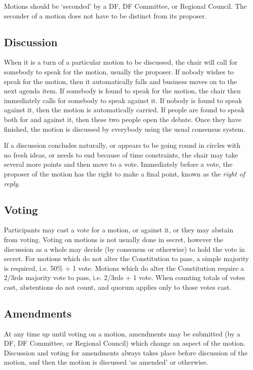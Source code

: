 \documentclass[a4paper, 11pt]{article} %
\begin{document}
Motions should be `seconded' by a DF, DF Committee, or Regional Council.  The seconder of a motion does not have to be distinct from its proposer.

\subsection{Discussion}
When it is a turn of a particular motion to be discussed, the chair will call for somebody to speak for the motion, usually the proposer.  If nobody wishes to speak for the motion, then it automatically falls and business moves on to the next agenda item.  If somebody is found to speak for the motion, the chair then immediately calls for somebody to speak against it.  If nobody is found to speak against it, then the motion is automatically carried.  If people are found to speak both for and against it, then these two people open the debate.  Once they have finished, the motion is discussed by everybody using the usual consensus system.

If a discussion concludes naturally, or appears to be going round in circles with no fresh ideas, or needs to end because of time constraints, the chair may take several more points and then move to a vote.  Immediately before a vote, the proposer of the motion has the right to make a final point, known as the \emph{right of reply}.

\subsection{Voting}
\label{sec:motionvoting}
Participants may cast a vote for a motion, or against it, or they may abstain from voting.  Voting on motions is not usually done in secret, however the discussion as a whole may decide (by consensus or otherwise) to hold the vote in secret.  For motions which do not alter the Constitution to pass, a simple majority is required, i.e. 50\% + 1 vote.  Motions which do alter the Constitution require a 2/3rds majority vote to pass, i.e. 2/3rds + 1 vote.  When counting totals of votes cast, abstentions do not count, and quorum applies only to those votes cast.

\subsection{Amendments}
At any time up until voting on a motion, amendments may be submitted (by a DF, DF Committee, or Regional Council) which change an aspect of the motion.  Discussion and voting for amendments always takes place before discussion of the motion, and then the motion is discussed `as amended' or otherwise.
\end{document}
